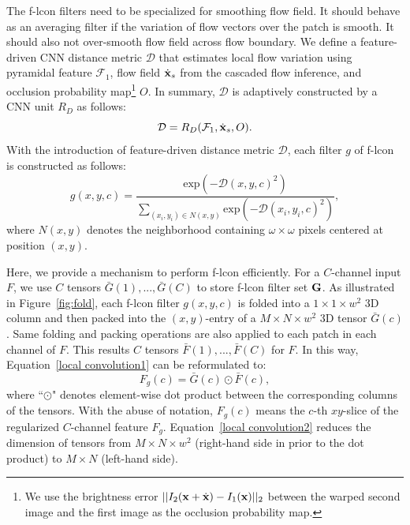 \documentclass[10pt,twocolumn,letterpaper]{article}
\begin{document}
The f-lcon filters need to be specialized for smoothing flow field. It should behave as an averaging filter if the variation of flow vectors over the patch is smooth. It should also not over-smooth flow field across flow boundary. We define a feature-driven CNN distance metric $\mathcal{D}$ that estimates local flow variation using pyramidal feature $\mathcal{F}_{1}$, flow field $\dot{\bf x}_{s}$ from the cascaded flow inference, and occlusion probability map\footnote{We use the brightness error $||I_{2}({\bf x}+\dot{\bf x})-I_{1}({\bf x})||_{2}$ between the warped second image and the first image as the occlusion probability map.} $O$.
%
In summary, $\mathcal{D}$ is adaptively constructed by a CNN unit $R_{D}$ as follows:  
\begin{equation}
     \mathcal{D} = R_{D}(\mathcal{F}_{1}, \dot{\bf x}_{s}, O).
\end{equation}
With the introduction of feature-driven distance metric $\mathcal{D}$, each filter $g$ of f-lcon is constructed as follows:
\begin{equation}
     g(x,y,c) = \frac{\text{exp}(-\mathcal{D}(x,y,c)^{2})}{\sum_{(x_{i},y_{i}) \in N(x,y)} \text{exp}(-\mathcal{D}(x_{i},y_{i},c)^{2})},
\end{equation} 
where $N(x,y)$ denotes the neighborhood containing $\omega \times \omega$ pixels centered at position $(x,y)$.

Here, we provide a mechanism to perform f-lcon efficiently. For a $C$-channel input $F$, we use $C$ tensors $\bar G(1), ..., \bar G(C)$ to store f-lcon filter set ${\bf G}$. As illustrated in Figure~\ref{fig:fold}, each f-lcon filter $g(x,y,c)$ is folded into a $1 \times 1 \times w^{2}$ 3D column and then packed into the $(x,y)$-entry of a $M \times N \times w^{2}$ 3D tensor $\bar G(c)$. Same folding and packing operations are also applied to each patch in each channel of $F$. This results $C$ tensors $\bar F(1), ..., \bar F(C)$ for $F$. In this way, Equation~\eqref{local convolution1} can be reformulated to:
\begin{equation}\label{local convolution2}
   F_{g}(c) = \bar G(c) \odot \bar F(c),
\end{equation}
where ``$\odot$" denotes element-wise dot product between the corresponding columns of the tensors. With the abuse of notation, $F_{g}(c)$ means the $c$-th $xy$-slice of the regularized $C$-channel feature $F_{g}$. Equation~\eqref{local convolution2} reduces the dimension of tensors from $M \times N \times w^{2}$ (right-hand side in prior to the dot product) to $M \times N$ (left-hand side).
\end{document}
